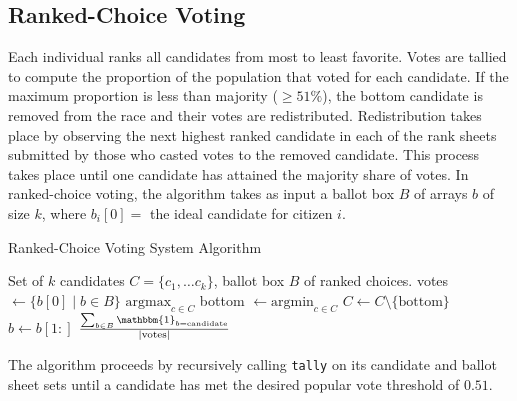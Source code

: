 \subsection{Ranked-Choice Voting}
Each individual ranks all candidates from most to least favorite.
Votes are tallied to compute the proportion of the population that voted for each candidate.
If the maximum proportion is less than majority ($\geq 51\%$), the bottom candidate is removed from the race and their votes are redistributed.
Redistribution takes place by observing the next highest ranked candidate in each of the rank sheets submitted by those who casted votes
to the removed candidate. This process takes place until one candidate has attained the majority share of votes. \newline
\indent In ranked-choice voting, the algorithm takes as input a ballot box $B$ of arrays $b$ of size $k$, where $b_i[0] = $ the ideal candidate for 
citizen $i$.
\begin{algorithm}[H]
\caption{Ranked-Choice Voting System Algorithm}\label{alg:ranked}
\begin{algorithmic}
    \Require Set of $k$ candidates $C=\{c_1, \ldots c_k\}$, ballot box $B$ of ranked choices.
        \State votes $\leftarrow \{b[0] \mid b \in B\}$
            \State \Return $\mathrm{argmax}_{c \in C}$ 
        \Else
            \State bottom $\leftarrow \mathrm{argmin}_{c \in C}$ 
            \State $C \leftarrow C \setminus \{\mathrm{bottom}\}$
                    \State $b \leftarrow b[1:]$ 
                \EndIf
            \EndFor
        \EndIf
    \EndFunction
        \State \Return $\frac{\sum_{b \in B}\mathbbm{1}_{b = \mathrm{candidate}}}{|\mathrm{votes}|}$
    \EndFunction
\end{algorithmic}
\end{algorithm}
The algorithm proceeds by recursively calling \texttt{tally} on its candidate and ballot sheet sets until a candidate has met
the desired popular vote threshold of $0.51$.
